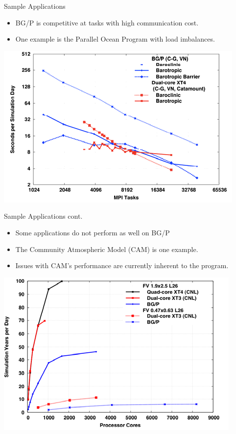 \documentclass{beamer}
\begin{document}
\begin{frame}{Sample Applications}
\begin{itemize}
\item BG/P is competitive at tasks with high communication cost.
\item One example is the Parallel Ocean Program with load imbalances.
\end{itemize}
\begin{center}
\includegraphics[scale=.45]{figs/pop.png}
\end{center}
\end{frame}

\begin{frame}{Sample Applications cont.}
\begin{itemize}
\item Some applications do not perform as well on BG/P
\item The Community Atmospheric Model (CAM) is one example.
\item Issues with CAM's performance are currently inherent to the program.
\end{itemize}
\begin{center}
\includegraphics[scale=.45]{figs/cam.png}
\end{center}
\end{frame}
\end{document}
